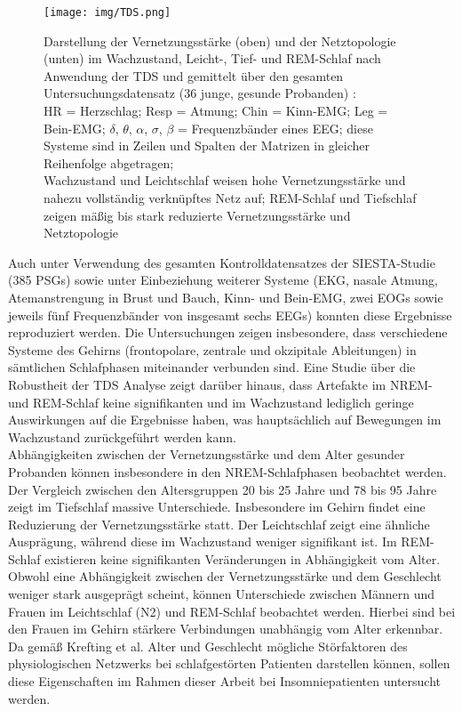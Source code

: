 \begin{figure}[H]
	\centering
	\texttt{[image: img/TDS.png]}
	\caption[Vernetzungsstärke und Netztopologie im \acs{TDS} Verfahren]{Darstellung der Vernetzungsstärke (oben) und der Netztopologie (unten) im Wachzustand, Leicht-, Tief- und \acs{REM}-Schlaf nach Anwendung der \acs{TDS} und gemittelt über den gesamten Untersuchungsdatensatz (36 junge, gesunde Probanden) \parencite{bashan_network_2012}:\\HR = Herzschlag; Resp = Atmung; Chin = Kinn-\acs{EMG}; Leg = Bein-\acs{EMG}; $\delta$, $\theta$, $\alpha$, $\sigma$, $\beta$ = Frequenzbänder eines \acs{EEG}; diese Systeme sind in Zeilen und Spalten der Matrizen in gleicher Reihenfolge abgetragen;\\Wachzustand und Leichtschlaf weisen hohe Vernetzungsstärke und nahezu vollständig verknüpftes Netz auf; \acs{REM}-Schlaf und Tiefschlaf zeigen mäßig bis stark reduzierte Vernetzungsstärke und Netztopologie\\}
	\label{fig:TDS}
\end{figure}

Auch unter Verwendung des gesamten Kontrolldatensatzes der SIESTA-Studie (385 \acs{PSG}s) sowie unter Einbeziehung weiterer Systeme (\acs{EKG}, nasale Atmung, Atemanstrengung in Brust und Bauch, Kinn- und Bein-\acs{EMG}, zwei \acs{EOG}s sowie jeweils fünf Frequenzbänder von insgesamt sechs \acs{EEG}s) konnten diese Ergebnisse reproduziert werden. Die Untersuchungen zeigen insbesondere, dass verschiedene Systeme des Gehirns (frontopolare, zentrale und okzipitale Ableitungen) in sämtlichen Schlafphasen miteinander verbunden sind. Eine Studie über die Robustheit der \acs{TDS} Analyse zeigt darüber hinaus, dass Artefakte im \acs{NREM}- und \acs{REM}-Schlaf keine signifikanten und im Wachzustand lediglich geringe Auswirkungen auf die Ergebnisse haben, was hauptsächlich auf Bewegungen im Wachzustand zurückgeführt werden kann. \parencite{bartsch_network_2015, breuer_netzwerktopologie_2016}\\

Abhängigkeiten zwischen der Vernetzungsstärke und dem Alter gesunder Probanden können insbesondere in den \acs{NREM}-Schlafphasen beobachtet werden. Der Vergleich zwischen den Altersgruppen 20 bis 25 Jahre und 78 bis 95 Jahre zeigt im Tiefschlaf massive Unterschiede. Insbesondere im Gehirn findet eine Reduzierung der Vernetzungsstärke statt. Der Leichtschlaf zeigt eine ähnliche Ausprägung, während diese im Wachzustand weniger signifikant ist. Im \acs{REM}-Schlaf existieren keine signifikanten Veränderungen in Abhängigkeit vom Alter. Obwohl eine Abhängigkeit zwischen der Vernetzungsstärke und dem Geschlecht weniger stark ausgeprägt scheint, können Unterschiede zwischen Männern und Frauen im Leichtschlaf (N2) und \acs{REM}-Schlaf beobachtet werden. Hierbei sind bei den Frauen im Gehirn stärkere Verbindungen unabhängig vom Alter erkennbar. Da gemäß Krefting et al. Alter und Geschlecht mögliche Störfaktoren des physiologischen Netzwerks bei schlafgestörten Patienten darstellen können, sollen diese Eigenschaften im Rahmen dieser Arbeit bei Insomniepatienten untersucht werden. \parencite{krefting_altersabhangigkeit_2016, krefting_age_2017}

